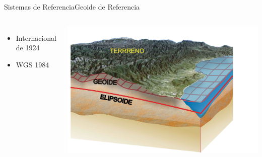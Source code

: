 \documentclass{beamer}
\begin{document}
\begin{frame}{Sistemas de Referencia}{Geoide de Referencia}
	\begin{columns}[]
		\begin{itemize}
			\item Internacional de 1924
			\item WGS 1984
		\end{itemize}
		\includegraphics[width=\textwidth]{IMGs/geoide}
	\end{columns}
\end{frame}
\end{document}
